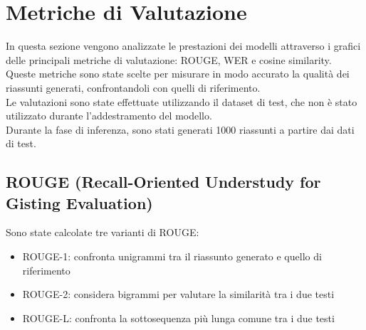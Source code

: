 \section{Metriche di Valutazione}
In questa sezione vengono analizzate le prestazioni dei modelli attraverso i grafici delle principali metriche di valutazione: ROUGE, WER e cosine similarity. 
Queste metriche sono state scelte per misurare in modo accurato la qualit\`a dei riassunti generati, confrontandoli con quelli di riferimento.\\
Le valutazioni sono state effettuate utilizzando il dataset di test, che non \`e stato utilizzato durante l'addestramento del modello.\\
Durante la fase di inferenza, sono stati generati 1000 riassunti a partire dai dati di test.

\subsection{ROUGE (Recall-Oriented Understudy for Gisting Evaluation)}
Sono state calcolate tre varianti di ROUGE:
\begin{itemize}
    \item ROUGE-1: confronta unigrammi tra il riassunto generato e quello di riferimento
    \item ROUGE-2: considera bigrammi per valutare la similarit\`a tra i due testi
    \item ROUGE-L: confronta la sottosequenza pi\`u lunga comune tra i due testi
\end{itemize}    


